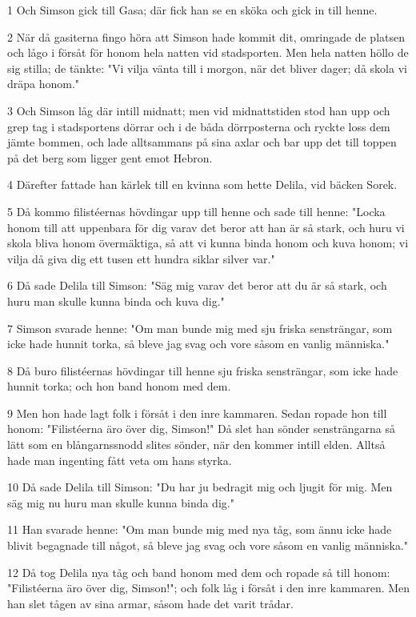 \par 1 Och Simson gick till Gasa; där fick han se en sköka och gick in till henne.
\par 2 När då gasiterna fingo höra att Simson hade kommit dit, omringade de platsen och lågo i försåt för honom hela natten vid stadsporten. Men hela natten höllo de sig stilla; de tänkte: "Vi vilja vänta till i morgon, när det bliver dager; då skola vi dräpa honom."
\par 3 Och Simson låg där intill midnatt; men vid midnattstiden stod han upp och grep tag i stadsportens dörrar och i de båda dörrposterna och ryckte loss dem jämte bommen, och lade alltsammans på sina axlar och bar upp det till toppen på det berg som ligger gent emot Hebron.
\par 4 Därefter fattade han kärlek till en kvinna som hette Delila, vid bäcken Sorek.
\par 5 Då kommo filistéernas hövdingar upp till henne och sade till henne: "Locka honom till att uppenbara för dig varav det beror att han är så stark, och huru vi skola bliva honom övermäktiga, så att vi kunna binda honom och kuva honom; vi vilja då giva dig ett tusen ett hundra siklar silver var."
\par 6 Då sade Delila till Simson: "Säg mig varav det beror att du är så stark, och huru man skulle kunna binda och kuva dig."
\par 7 Simson svarade henne: "Om man bunde mig med sju friska sensträngar, som icke hade hunnit torka, så bleve jag svag och vore såsom en vanlig människa."
\par 8 Då buro filistéernas hövdingar till henne sju friska sensträngar, som icke hade hunnit torka; och hon band honom med dem.
\par 9 Men hon hade lagt folk i försåt i den inre kammaren. Sedan ropade hon till honom: "Filistéerna äro över dig, Simson!" Då slet han sönder sensträngarna så lätt som en blångarnssnodd slites sönder, när den kommer intill elden. Alltså hade man ingenting fått veta om hans styrka.
\par 10 Då sade Delila till Simson: "Du har ju bedragit mig och ljugit för mig. Men säg mig nu huru man skulle kunna binda dig."
\par 11 Han svarade henne: "Om man bunde mig med nya tåg, som ännu icke hade blivit begagnade till något, så bleve jag svag och vore såsom en vanlig människa."
\par 12 Då tog Delila nya tåg och band honom med dem och ropade så till honom: "Filistéerna äro över dig, Simson!"; och folk låg i försåt i den inre kammaren. Men han slet tågen av sina armar, såsom hade det varit trådar.
